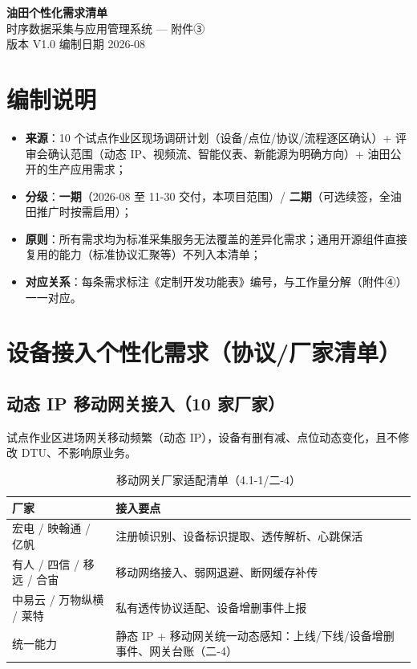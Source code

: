 \documentclass[11pt,a4paper]{ctexart}
\begin{document}
\begin{center}
{\Huge\bfseries 油田个性化需求清单}\\[14pt]
{\large 时序数据采集与应用管理系统 — 附件③}\\[8pt]
{\large 版本 V1.0 \quad 编制日期 2026-08}
\end{center}

\vspace{1em}
\noindent\hrulefill
\vspace{1em}

\section{编制说明}

\begin{itemize}[leftmargin=*]
  \item \textbf{来源}：10 个试点作业区现场调研计划（设备/点位/协议/流程逐区确认）+ 评审会确认范围（动态 IP、视频流、智能仪表、新能源为明确方向）+ 油田公开的生产应用需求；
  \item \textbf{分级}：\textbf{一期}（2026-08 至 11-30 交付，本项目范围）/ \textbf{二期}（可选续签，全油田推广时按需启用）；
  \item \textbf{原则}：所有需求均为标准采集服务无法覆盖的差异化需求；通用开源组件直接复用的能力（标准协议汇聚等）不列入本清单；
  \item \textbf{对应关系}：每条需求标注《定制开发功能表》编号，与工作量分解（附件④）一一对应。
\end{itemize}

\section{设备接入个性化需求（协议/厂家清单）}

\subsection{动态 IP 移动网关接入（10 家厂家）}

试点作业区进场网关移动频繁（动态 IP），设备有删有减、点位动态变化，且不修改 DTU、不影响原业务。

\begin{table}[H]\centering
\caption{移动网关厂家适配清单（4.1-1/二-4）}
\begin{tabular}{p{4.5cm} p{8.5cm}}
\toprule
\textbf{厂家} & \textbf{接入要点} \\
\midrule
宏电 / 映翰通 / 亿帆 & 注册帧识别、设备标识提取、透传解析、心跳保活 \\
有人 / 四信 / 移远 / 合宙 & 移动网络接入、弱网退避、断网缓存补传 \\
中易云 / 万物纵横 / 莱特 & 私有透传协议适配、设备增删事件上报 \\
\midrule
统一能力 & 静态 IP + 移动网关统一动态感知：上线/下线/设备增删事件、网关台账（二-4） \\
\bottomrule
\end{tabular}
\end{table}
\end{document}
